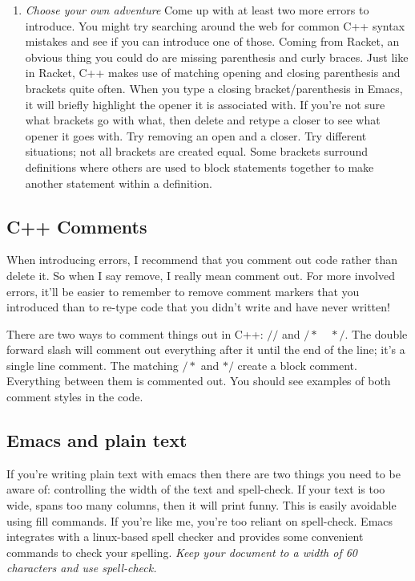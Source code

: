 \documentclass[]{tufte-handout}
\begin{document}
\begin{enumerate}
\item \textit{Choose your own adventure} \newline
Come up with at least two more errors to introduce. You might try searching around the web for common C++ syntax mistakes and see if you can introduce one of those.  Coming from Racket, an obvious thing you could do are missing parenthesis and curly braces. Just like in Racket, C++ makes use of matching opening and closing parenthesis and brackets quite often. When you type a closing bracket/parenthesis in Emacs, it will briefly highlight the opener it is associated with. If you're not sure what brackets go with what, then delete and retype a closer to see what opener it goes with. Try removing an open and a closer. Try different situations; not all brackets are created equal. Some brackets surround definitions where others are used to block statements together to make another statement within a definition. 
\end{enumerate}



\subsection{C++ Comments}

When introducing errors, I recommend that you comment out code rather than delete it. So when I say remove, I really mean comment out. For more involved errors, it'll be easier to remember to remove comment markers that you introduced than to re-type code that you didn't write and have never written!

There are two ways to comment things out in C++: $//$ and $/* \quad */$. The double forward slash will comment out everything after it until the end of the line; it's a single line comment. The matching $/*$ and $*/$ create a block comment. Everything between them is commented out. You should see examples of both comment styles in the code. 

\subsection{Emacs and plain text}

If you're writing plain text with emacs then there are two things you need to be aware of: controlling the width of the text and spell-check. If your text is too wide, spans too many columns, then it will print funny.  This is easily avoidable using fill commands. If you're like me, you're too reliant on spell-check.  Emacs integrates with a linux-based spell checker and provides some convenient commands to check your spelling. \textit{Keep your document to a width of 60 characters and use spell-check.}
\end{document}
